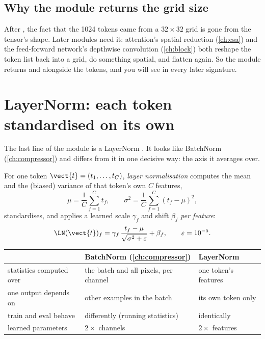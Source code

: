 \subsection{Why the module returns the grid size}

After , the fact that the 1024 tokens came from a $32\times32$ grid is gone from the
tensor's shape. Later modules need it: attention's spatial reduction (\cref{ch:esa}) and the
feed-forward network's depthwise convolution (\cref{ch:block}) both reshape the token list back into a
grid, do something spatial, and flatten again. So the module returns  and 
alongside the tokens, and you will see  in every later signature.

\section{LayerNorm: each token standardised on its own}\label{sec:patchembed:ln}

The last line of the module is a LayerNorm \citep{ba2016layer}. It looks like BatchNorm
(\cref{ch:compressor}) and differs from it in one decisive way: the axis it averages over.

\begin{definition}
For one token $\vect{t} = (t_1,\dots,t_C)$, \emph{layer normalisation}
computes the mean and the (biased) variance of that token's own $C$ features,
\begin{equation}\label{eq:patchembed:lnstats}
\mu = \frac{1}{C}\sum_{f=1}^{C} t_f,\qquad
\sigma^2 = \frac{1}{C}\sum_{f=1}^{C} (t_f - \mu)^2,
\end{equation}
standardises, and applies a learned scale $\gamma_f$ and shift $\beta_f$ \emph{per feature}:
\begin{equation}\label{eq:patchembed:ln}
\LN(\vect{t})_f = \gamma_f\,\frac{t_f - \mu}{\sqrt{\sigma^2 + \varepsilon}} + \beta_f,\qquad
\varepsilon = 10^{-5}.
\end{equation}
\end{definition}

\begin{center}
\begin{tabular}{lll}
\toprule
& BatchNorm (\cref{ch:compressor}) & LayerNorm\\
\midrule
statistics computed over & the batch and all pixels, per channel & one token's features\\
one output depends on & other examples in the batch & its own token only\\
train and eval behave & differently (running statistics) & identically\\
learned parameters & $2\times$ channels & $2\times$ features\\
\bottomrule
\end{tabular}
\end{center}

